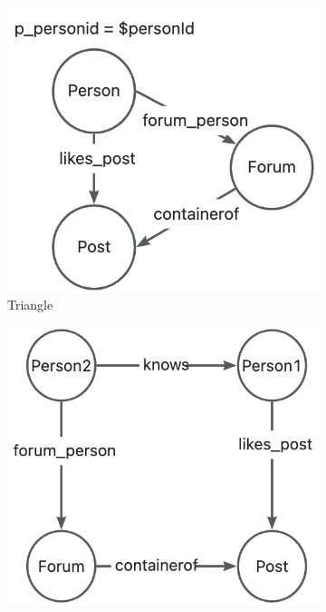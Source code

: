 \begin{figure}[ht]
    \centering
    \begin{subfigure}[b]{.3\linewidth}
        \centering
        \includegraphics[width=\linewidth]{./figures/exp/pattern-triangle.png}
        \caption{Triangle}
        \label{fig:exp-hard-triangle}
    \end{subfigure}
    \begin{subfigure}[b]{.3\linewidth}
        \centering
        \includegraphics[width=\linewidth]{./figures/exp/pattern-butterfly.png}

\end{subfigure}
\end{figure}
